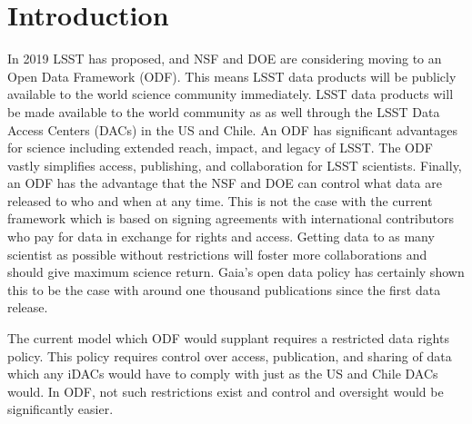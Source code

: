 \section{Introduction}\label{sec:intro}

In 2019 LSST has proposed, and NSF and DOE are considering moving to an Open Data Framework (ODF). This means LSST data products will be publicly available to the world science community immediately. LSST data products will be made available to the world community as as well through the LSST Data Access Centers (DACs) in the US and Chile. An ODF has significant advantages for science including extended reach, impact, and legacy of LSST. The ODF vastly simplifies access, publishing, and collaboration for LSST scientists. Finally, an ODF has the advantage that the NSF and DOE can control what data are released to who and when at any time. This is not the case with the current framework which is based on signing agreements with international contributors who pay for data in exchange for rights and access. Getting data to as many scientist as possible without restrictions will foster more collaborations and should give maximum science return. Gaia's \citep{2016A&A...595A...1G} open data policy has certainly shown this to be the case with around one thousand publications since the first data release. %

The current model which ODF would supplant requires a restricted data rights policy.  This policy requires control over access, publication, and sharing of data which any iDACs would have to comply with just as the US and Chile DACs would. In ODF, not such restrictions exist and control and oversight would be significantly easier.


